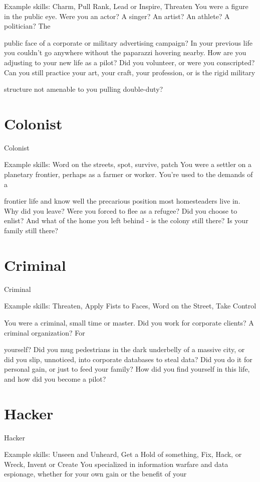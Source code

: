 Example skills: Charm, Pull Rank, Lead or Inspire, Threaten
You were a figure in the public eye. Were you an actor? A singer? An artist? An athlete? A politician? The

public face of a corporate or military advertising campaign? In your previous life you couldn’t go anywhere
without the paparazzi hovering nearby. How are you adjusting to your new life as a pilot? Did you volunteer,
or were you conscripted? Can you still practice your art, your craft, your profession, or is the rigid military

structure not amenable to you pulling double-duty?
\section{Colonist}
                                                    Colonist

Example skills: Word on the streets, spot, survive, patch
You were a settler on a planetary frontier, perhaps as a farmer or worker. You’re used to the demands of a

frontier life and know well the precarious position most homesteaders live in. Why did you leave? Were you
forced to flee as a refugee? Did you choose to enlist? And what of the home you left behind - is the colony
still there? Is your family still there?
\section{Criminal}
                                                    Criminal

Example skills: Threaten, Apply Fists to Faces, Word on the Street, Take Control

You were a criminal, small time or master. Did you work for corporate clients? A criminal organization? For

yourself? Did you mug pedestrians in the dark underbelly of a massive city, or did you slip, unnoticed, into
corporate databases to steal data? Did you do it for personal gain, or just to feed your family? How did you
find yourself in this life, and how did you become a pilot?

\section{Hacker}
                                                     Hacker

Example skills: Unseen and Unheard, Get a Hold of something, Fix, Hack, or Wreck, Invent or
Create
You specialized in information warfare and data espionage, whether for your own gain or the benefit of your

